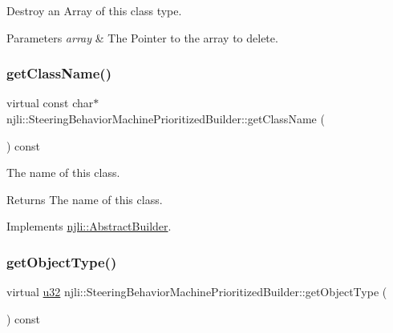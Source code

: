 Destroy an Array of this class type.


\begin{DoxyParams}{Parameters}
{\em array} & The Pointer to the array to delete. \\
\hline
\end{DoxyParams}
\mbox{\label{classnjli_1_1_steering_behavior_machine_prioritized_builder_a678f55d2f2c28d4a7b01a32187e49314}} 
\subsubsection{\texorpdfstring{get\+Class\+Name()}{getClassName()}}
{\footnotesize\ttfamily virtual const char$\ast$ njli\+::\+Steering\+Behavior\+Machine\+Prioritized\+Builder\+::get\+Class\+Name (\begin{DoxyParamCaption}{ }\end{DoxyParamCaption}) const\hspace{0.3cm}{\ttfamily [virtual]}}

The name of this class.

\begin{DoxyReturn}{Returns}
The name of this class. 
\end{DoxyReturn}


Implements \mbox{\hyperlink{classnjli_1_1_abstract_builder_a902f73ea78031b06aca183a417f3413b}{njli\+::\+Abstract\+Builder}}.

\mbox{\label{classnjli_1_1_steering_behavior_machine_prioritized_builder_aff6da14dae45d6bcebe4fa80f2af2959}} 
\subsubsection{\texorpdfstring{get\+Object\+Type()}{getObjectType()}}
{\footnotesize\ttfamily virtual \mbox{\hyperlink{_util_8h_a10e94b422ef0c20dcdec20d31a1f5049}{u32}} njli\+::\+Steering\+Behavior\+Machine\+Prioritized\+Builder\+::get\+Object\+Type (\begin{DoxyParamCaption}{ }\end{DoxyParamCaption}) const\hspace{0.3cm}{\ttfamily [virtual]}}


